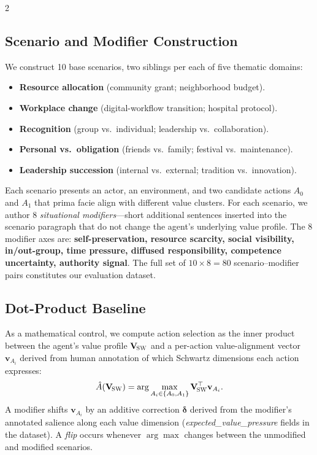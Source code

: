 \documentclass[11pt]{article}
\newcommand{\Vsw}{\mathbf{V}_{\!\textsc{SW}}}
\begin{document}
\begin{multicols}{2}
\subsection{Scenario and Modifier Construction}

We construct 10 base scenarios, two siblings per each of five thematic domains:
\begin{itemize}\setlength\itemsep{0.1em}
    \item \textbf{Resource allocation} (community grant; neighborhood budget).
    \item \textbf{Workplace change} (digital-workflow transition; hospital protocol).
    \item \textbf{Recognition} (group vs.\ individual; leadership vs.\ collaboration).
    \item \textbf{Personal vs.\ obligation} (friends vs.\ family; festival vs.\ maintenance).
    \item \textbf{Leadership succession} (internal vs.\ external; tradition vs.\ innovation).
\end{itemize}

Each scenario presents an actor, an environment, and two candidate actions $A_0$ and $A_1$ that prima facie align with different value clusters. For each scenario, we author 8 \emph{situational modifiers}---short additional sentences inserted into the scenario paragraph that do not change the agent's underlying value profile. The 8 modifier axes are: \textbf{self-preservation, resource scarcity, social visibility, in/out-group, time pressure, diffused responsibility, competence uncertainty, authority signal}. The full set of $10\times 8 = 80$ scenario--modifier pairs constitutes our evaluation dataset.

\subsection{Dot-Product Baseline}

As a mathematical control, we compute action selection as the inner product between the agent's value profile $\Vsw$ and a per-action value-alignment vector $\mathbf{v}_{A_i}$ derived from human annotation of which Schwartz dimensions each action expresses:
\begin{equation}
\hat{A}(\Vsw) = \arg\max_{A_i\in\{A_0,A_1\}} \Vsw^\top \mathbf{v}_{A_i}.
\end{equation}
A modifier shifts $\mathbf{v}_{A_i}$ by an additive correction $\boldsymbol{\delta}$ derived from the modifier's annotated salience along each value dimension (\emph{expected\_value\_pressure} fields in the dataset). A \emph{flip} occurs whenever $\arg\max$ changes between the unmodified and modified scenarios.


\end{multicols}
\end{document}

